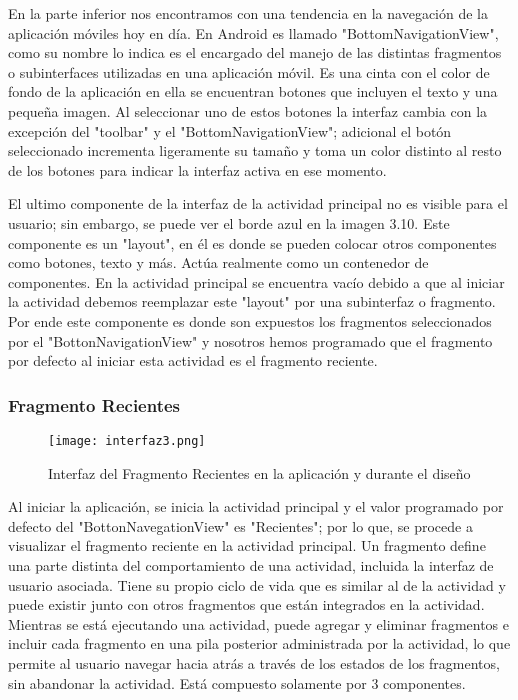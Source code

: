 \par \noindent
En la parte inferior nos encontramos con una tendencia en la navegación de la aplicación móviles hoy en día. En Android es llamado "BottomNavigationView", como su nombre lo indica es el encargado del manejo de las distintas fragmentos o subinterfaces utilizadas en una aplicación móvil. Es una cinta con el color de fondo de la aplicación en ella se encuentran botones que incluyen el texto y una pequeña imagen. Al seleccionar uno de estos botones la interfaz cambia con la excepción del "toolbar" y el "BottomNavigationView"; adicional el botón seleccionado incrementa ligeramente su tamaño y toma un color distinto al resto de los botones para indicar la interfaz activa en ese momento.

\par \noindent
El ultimo componente de la interfaz de la actividad principal no es visible para el usuario; sin embargo, se puede ver el borde azul en la imagen 3.10. Este componente es un "layout", en él es donde se pueden colocar otros componentes como botones, texto y más. Actúa realmente como un contenedor de componentes. En la actividad principal se encuentra vacío debido a que al iniciar la actividad debemos reemplazar este "layout" por una subinterfaz o fragmento. Por ende este componente es donde son expuestos los fragmentos seleccionados por el "BottonNavigationView" y nosotros hemos programado que el fragmento por defecto al iniciar esta actividad es el fragmento reciente.

\subsubsection{Fragmento Recientes}

\begin{figure}[H]
	\centering
	\texttt{[image: interfaz3.png]}
	\caption{Interfaz del Fragmento Recientes en la aplicación y durante el diseño}
\end{figure}

\par \noindent
Al iniciar la aplicación, se inicia la actividad principal y el valor programado por defecto del "BottonNavegationView" es "Recientes"; por lo que, se procede a visualizar el fragmento reciente en la actividad principal. Un fragmento define una parte distinta del comportamiento de una actividad, incluida la interfaz de usuario asociada. Tiene su propio ciclo de vida que es similar al de la actividad y puede existir junto con otros fragmentos que están integrados en la actividad. Mientras se está ejecutando una actividad, puede agregar y eliminar fragmentos e incluir cada fragmento en una pila posterior administrada por la actividad, lo que permite al usuario navegar hacia atrás a través de los estados de los fragmentos, sin abandonar la actividad\cite{androidapp}. Está compuesto solamente por 3 componentes. 

